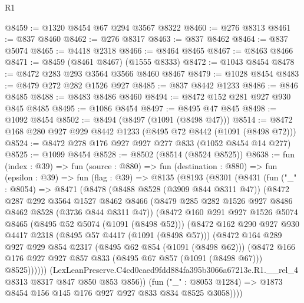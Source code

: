 \begin{lexlean}{R1}
\begin{coremodule}
@8459 := @1320 @8454 @67 @294 @3567 @8322
@8460 := @276 @8313
@8461 := @837 @8460
@8462 := @276 @8317
@8463 := @837 @8462
@8464 := @837 @5074
@8465 := @4418 @2318
@8466 := @8464 @8465
@8467 := @8463 @8466
@8471 := @8459 (@8461 @8467) (@1555 @8333)
@8472 := @1043 @8454
@8478 := @8472 @283 @293 @3564 @3566 @8460 @8467
@8479 := @1028 @8454
@8483 := @8479 @272 @282 @1526 @927
@8485 := @837 @8442 @1233
@8486 := @846 @8485
@8488 := @8483 @8486 @8460
@8494 := @8472 @152 @281 @927 @930 @845 @8485
@8495 := @1086 @8454
@8497 := @8495 @47 @845
@8498 := @1092 @8454
@8502 := @8494 (@8497 (@1091 (@8498 @47)))
@8514 := @8472 @168 @280 @927 @929 @8442 @1233 (@8495 @72 @8442 (@1091 (@8498 @72)))
@8524 := @8472 @278 @176 @927 @927 @277 @833 (@1052 @8454 @14 @277)
@8525 := @1099 @8454
@8528 := @8502 (@8514 (@8524 @8525))
@8638 := fun (index : @39) =>
  fun (source : @880) =>
  fun (destination : @880) =>
  fun (epsilon : @39) =>
  fun (flag : @39) =>
  @8135
    (@8193
      (@8301
        (@8431
          (fun ("_" : @8054) =>
          @8471
            (@8478
              (@8488 @8528 (@3909 @844 @8311 @47))
              (@8472
                @287
                @292
                @3564
                @1527
                @8462
                @8466
                (@8479 @285 @282 @1526 @927 @8486 @8462 @8528 (@3736 @844 @8311 @47))
                (@8472
                  @160
                  @291
                  @927
                  @1526
                  @5074
                  @8465
                  (@8495 @52 @5074 (@1091 (@8498 @52)))
                  (@8472
                    @162
                    @290
                    @927
                    @930
                    @4417
                    @2318
                    (@8495 @57 @4417 (@1091 (@8498 @57)))
                    (@8472
                      @164
                      @289
                      @927
                      @929
                      @854
                      @2317
                      (@8495 @62 @854 (@1091 (@8498 @62)))
                      (@8472
                        @166
                        @176
                        @927
                        @927
                        @857
                        @833
                        (@8495 @67 @857 (@1091 (@8498 @67)))
                        @8525))))))
            (LexLeanPreserve.C4cd0caed9fdd884fa395b3066a67213e.R1.__rel_4
              @8313
              @8317
              @847
              @850
              @853
              @856))
          (fun ("_" : @8053 @1284) => @1873 @8454 @156 @145 @176 @927 @927 @833 @834 @8525 @3058))))

\end{coremodule}
\end{lexlean}
